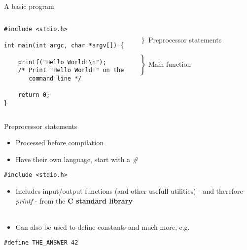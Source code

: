 \subsection{}
\begin{frame}[fragile]{A basic program}
	\begin{columns}[T]
		\begin{lstlisting}
#include <stdio.h>

int main(int argc, char *argv[]) {

	printf("Hello World!\n");
	/* Print "Hello World!" on the
	   command line */

	return 0;
}
\end{lstlisting}
		
		\ \\$\left. \begin{array}{c}\\\end{array}\right\rbrace $ Preprocessor statements
		\ \\\ \\$\left. \begin{array}{c}\\\\\\\\\\\\\end{array}\right\rbrace $ Main function
	\end{columns}
\end{frame}
\begin{frame}[fragile]{Preprocessor statements}	
	\begin{itemize}
		\item Processed before compilation
		\item Have their own language, start with a \textit{\#}
	\end{itemize}
	\begin{lstlisting}
#include <stdio.h>
\end{lstlisting}
	\begin{itemize}
		\item Includes input/output functions (and other usefull utilities) - and
		 therefore  \textit{printf} - from the \textbf{C standard library}\\ \ \\
		\item Can also be used to define constants and much more, e.g.
	\end{itemize}
\begin{lstlisting}[numbers=none]
#define THE_ANSWER 42
\end{lstlisting}
\end{frame}
